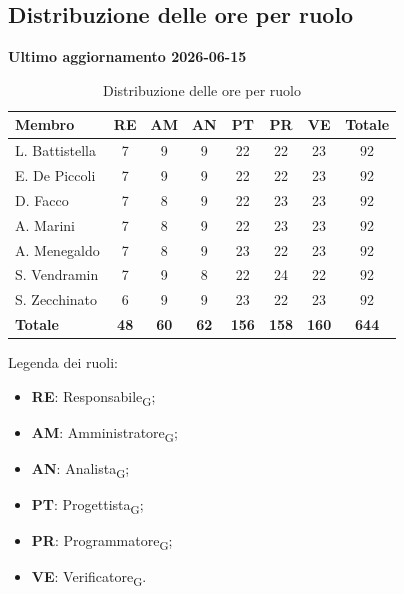 \documentclass[a4paper, 10pt, colorlinks=true, linkcolor=black, urlcolor=blue, citecolor=blue, hidelinks]{article}
\renewcommand{\arraystretch}{1.2}
\begin{document}
\subsection{Distribuzione delle ore per ruolo}
\textbf{Ultimo aggiornamento 2026-06-15}

\begin{table}[H]
    \centering
    \renewcommand{\arraystretch}{1.3}
    \begin{tabularx}{\textwidth}{|L|c|c|c|c|c|c|c|}
        \hline
        \textbf{Membro} & \textbf{RE} & \textbf{AM} & \textbf{AN} & \textbf{PT} & \textbf{PR} & \textbf{VE} & \textbf{Totale} \\
        \hline
        L. Battistella & 7 & 9 & 9 & 22 & 22 & 23 & 92 \\
        \hline
        E. De Piccoli & 7 & 9 & 9 & 22 & 22 & 23 & 92 \\
        \hline
        D. Facco & 7 & 8 & 9 & 22 & 23 & 23 & 92 \\
        \hline
        A. Marini & 7 & 8 & 9 & 22 & 23 & 23 & 92 \\
        \hline
        A. Menegaldo & 7 & 8 & 9 & 23 & 22 & 23 & 92 \\
        \hline
        S. Vendramin & 7 & 9 & 8 & 22 & 24 & 22 & 92 \\
        \hline
        S. Zecchinato & 6 & 9 & 9 & 23 & 22 & 23 & 92 \\
        \hline
        \textbf{Totale} & \textbf{48} & \textbf{60} & \textbf{62} & \textbf{156} & \textbf{158} & \textbf{160} & \textbf{644} \\
        \hline
    \end{tabularx}
    \caption{Distribuzione delle ore per ruolo}
\end{table}

\noindent
Legenda dei ruoli:
\begin{itemize}
    \item \textbf{RE}: Responsabile\textsubscript{G};
    \item \textbf{AM}: Amministratore\textsubscript{G};
    \item \textbf{AN}: Analista\textsubscript{G};
    \item \textbf{PT}: Progettista\textsubscript{G};
    \item \textbf{PR}: Programmatore\textsubscript{G};
    \item \textbf{VE}: Verificatore\textsubscript{G}.
\end{itemize}
\end{document}
